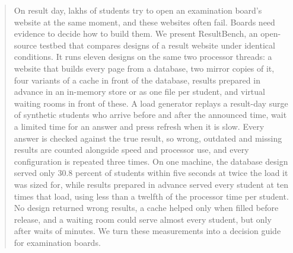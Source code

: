 \begin{abstract}
On result day, lakhs of students try to open an examination board's website at
the same moment, and these websites often fail. Boards need evidence to decide
how to build them. We present ResultBench, an open-source testbed that compares
designs of a result website under identical conditions. It runs eleven designs
on the same two processor threads: a website that builds every page from a
database, two mirror copies of it, four variants of a cache in front of the
database, results prepared in advance in an in-memory store or as one file per
student, and virtual waiting rooms in front of these. A
load generator replays a result-day surge of synthetic students who arrive
before and after the announced time, wait a limited time for an answer and
press refresh when it is slow. Every answer is checked against the true
result, so wrong, outdated and missing results are counted alongside speed and
processor use, and every configuration is repeated three times. On one
machine, the database design served only 30.8 percent of students within five
seconds at twice the load it was sized for, while results prepared in advance
served every student at ten times that load, using less than a twelfth of the
processor time per student. No design returned wrong results, a cache helped
only when filled before release, and a waiting room could serve almost every
student, but only after waits of minutes. We turn these measurements into a
decision guide for examination boards.
\end{abstract}
